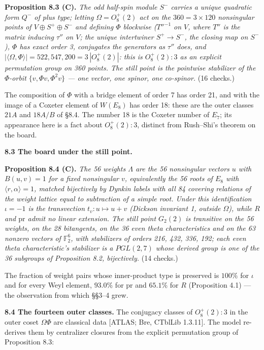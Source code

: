 \documentclass[
]{article}
\begin{document}
\textbf{Proposition 8.3 (C).} \emph{The odd half-spin module \(S^-\)
carries a unique quadratic form \(Q^-\) of plus type; letting
\(\Omega = O_8^+(2)\) act on the \(360 = 3 \times 120\) nonsingular
points of \(V \oplus S^+ \oplus S^-\) and defining \(\Phi\) blockwise
(\(T''^{-1}\) on \(V\), where \(T''\) is the matrix inducing \(\tau''\)
on \(V\); the unique intertwiner \(S^+ \to S^-\), the closing map on
\(S^-\)), \(\Phi\) has exact order 3, conjugates the generators as
\(\tau''\) does, and
\(|\langle \Omega, \Phi \rangle| = 522{,}547{,}200 = 3\,|O_8^+(2)|\):
this is \(O_8^+(2){:}3\) as an explicit permutation group on 360 points.
The still point is the pointwise stabilizer of the \(\Phi\)-orbit
\(\{v, \Phi v, \Phi^2 v\}\) --- one vector, one spinor, one co-spinor.}
(16 checks.)

The composition of \(\Phi\) with a bridge element of order 7 has order
21, and with the image of a Coxeter element of \(W(E_8)\) has order 18:
these are the outer classes \(21A\) and \(18A/B\) of §8.4. The number 18
is the Coxeter number of \(E_7\); its appearance here is a fact about
\(O_8^+(2){:}3\), distinct from Rush--Shi's theorem on the board.

\textbf{8.3 The board under the still point.}

\textbf{Proposition 8.4 (C).} \emph{The 56 weights \(\Lambda\) are the
56 nonsingular vectors \(u\) with \(B(u,v) = 1\) for a fixed nonsingular
\(v\), equivalently the 56 roots of \(E_8\) with
\(\langle r, \alpha \rangle = 1\), matched bijectively by Dynkin labels
with all 84 covering relations of the weight lattice equal to
subtraction of a simple root. Under this identification \(\iota = -1\)
is the transvection \(t_v : u \mapsto u + v\) (Dickson invariant 1,
outside \(\Omega\)), while \(R\) and \(\mathrm{pr}\) admit no linear
extension. The still point \(G_2(2)\) is transitive on the 56 weights,
on the 28 bitangents, on the 36 even theta characteristics and on the 63
nonzero vectors of \(\mathbb{F}_2^6\), with stabilizers of orders 216,
432, 336, 192; each even theta characteristic's stabilizer is a
\(PGL(2,7)\) whose derived group is one of the 36 subgroups of
Proposition 8.2, bijectively.} (14 checks.)

The fraction of weight pairs whose inner-product type is preserved is
\(100\%\) for \(\iota\) and for every Weyl element, \(93.0\%\) for
\(\mathrm{pr}\) and \(65.1\%\) for \(R\) (Proposition 4.1) --- the
observation from which §§3--4 grew.

\textbf{8.4 The fourteen outer classes.} The conjugacy classes of
\(O_8^+(2){:}3\) in the outer coset \(\Omega\Phi\) are classical data
{[}ATLAS; Bre, CTblLib 1.3.11{]}. The model re-derives them by
centralizer closures from the explicit permutation group of Proposition
8.3:
\end{document}
